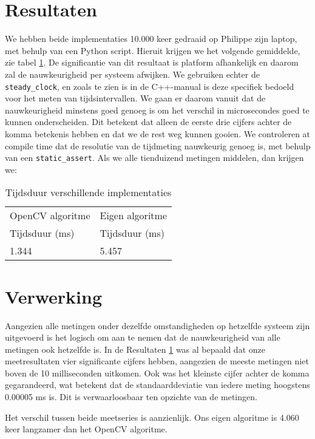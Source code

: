 \documentclass[a4paper]{article}
\begin{document}
\section{Resultaten}
\label{sec:org6d506c1}
We hebben beide implementaties 10.000 keer gedraaid op Philippe zijn laptop, met behulp van een Python script. Hieruit krijgen we het volgende gemiddelde, zie tabel \ref{tab:orgbf9d554}. De significantie van dit resultaat is platform afhankelijk en daarom zal de nauwkeurigheid per systeem afwijken. We gebruiken echter de \texttt{steady\_clock}, en zoals te zien is in de C++-manual is deze specifiek bedoeld voor het meten van tijdsintervallen. We gaan er daarom vanuit dat de nauwkeurigheid minstens goed genoeg is om het verschil in microsecondes goed te kunnen onderscheiden. Dit betekent dat alleen de eerste drie cijfers achter de komma betekenis hebben en dat we de rest weg kunnen gooien. We controleren at compile time dat de resolutie van de tijdmeting nauwkeurig genoeg is, met behulp van een \texttt{static\_assert}. Als we alle tienduizend metingen middelen, dan krijgen we:

\begin{table}[htbp]
\caption{\label{tab:orgbf9d554}
Tijdsduur verschillende implementaties}
\centering
\begin{tabular}{ll}
OpenCV algoritme & Eigen algoritme\\
Tijdsduur (ms) & Tijdsduur (ms)\\
\hline
1.344 & 5.457\\
\end{tabular}
\end{table}

\section{Verwerking}
\label{sec:org6caba27}
Aangezien alle metingen onder dezelfde omstandigheden op hetzelfde systeem zijn uitgevoerd is het logisch om aan te nemen dat de nauwkeurigheid van alle metingen ook hetzelfde is. In de Resultaten \ref{sec:org6d506c1} was al bepaald dat onze meetresultaten vier significante cijfers hebben, aangezien de meeste metingen niet boven de 10 milliseconden uitkomen. Ook was het kleinste cijfer achter de komma gegarandeerd, wat betekent dat de standaarddeviatie van iedere meting hoogstens 0.00005 ms is. Dit is verwaarloosbaar ten opzichte van de metingen.

Het verschil tussen beide meetseries is aanzienlijk. Ons eigen algoritme is 4.060 keer langzamer dan het OpenCV algoritme.
\end{document}
